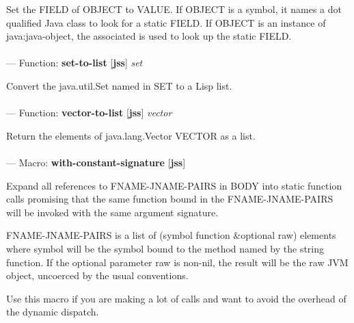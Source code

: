 \begin{adjustwidth}{5em}{5em}
Set the FIELD of OBJECT to VALUE.
If OBJECT is a symbol, it names a dot qualified Java class to look for
a static FIELD.  If OBJECT is an instance of java:java-object, the
associated is used to look up the static FIELD.
\end{adjustwidth}

\paragraph{}
\label{JSS:SET-TO-LIST}
--- Function: \textbf{set-to-list} [\textbf{jss}] \textit{set}

\begin{adjustwidth}{5em}{5em}
Convert the java.util.Set named in SET to a Lisp list.
\end{adjustwidth}

\paragraph{}
\label{JSS:VECTOR-TO-LIST}
--- Function: \textbf{vector-to-list} [\textbf{jss}] \textit{vector}

\begin{adjustwidth}{5em}{5em}
Return the elements of java.lang.Vector VECTOR as a list.
\end{adjustwidth}

\paragraph{}
\label{JSS:WITH-CONSTANT-SIGNATURE}
--- Macro: \textbf{with-constant-signature} [\textbf{jss}] \textit{}

\begin{adjustwidth}{5em}{5em}
Expand all references to FNAME-JNAME-PAIRS in BODY into static function calls promising that the same function bound in the FNAME-JNAME-PAIRS will be invoked with the same argument signature.

FNAME-JNAME-PAIRS is a list of (symbol function \&optional raw)
elements where symbol will be the symbol bound to the method named by
the string function.  If the optional parameter raw is non-nil, the
result will be the raw JVM object, uncoerced by the usual conventions.

Use this macro if you are making a lot of calls and 
want to avoid the overhead of the dynamic dispatch.
\end{adjustwidth}

